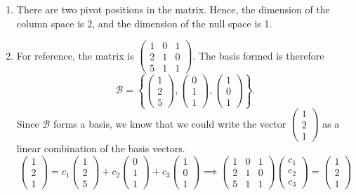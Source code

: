 \begin{enumerate}
	\item There are two pivot positions in the matrix. Hence, the dimension of the column space is 2, and the dimension of the null space is 1.
	\item For reference, the matrix is \(\begin{pmatrix}1 & 0 & 1 \\ 2 & 1 & 0 \\ 5 & 1 & 1\end{pmatrix}.\) The basis formed is therefore 
		\[\mathcal{B} = \left\{\!\begin{pmatrix}1 \\ 2 \\ 5\end{pmatrix}, \begin{pmatrix}0 \\ 1 \\ 1\end{pmatrix}, \begin{pmatrix}1 \\ 0 \\ 1\end{pmatrix}\!\right\}.\]
		Since \(\mathcal{B}\) forms a basis, we know that we could write the vector \(\begin{pmatrix}1 \\ 2 \\ 1\end{pmatrix}\) as a linear combination of the basis vectors.
\[\begin{pmatrix}1 \\ 2 \\ 1\end{pmatrix} = c_1\begin{pmatrix}1 \\ 2 \\ 5\end{pmatrix} + c_2\begin{pmatrix}0 \\ 1 \\ 1\end{pmatrix} + c_3\begin{pmatrix}1 \\ 0 \\ 1\end{pmatrix} \implies \begin{pmatrix}1 & 0 & 1 \\ 2 & 1 & 0 \\ 5 & 1 & 1\end{pmatrix}\begin{pmatrix}c_1 \\ c_2 \\ c_3\end{pmatrix} = \begin{pmatrix}1 \\ 2 \\1 \end{pmatrix}\]


\end{enumerate}
